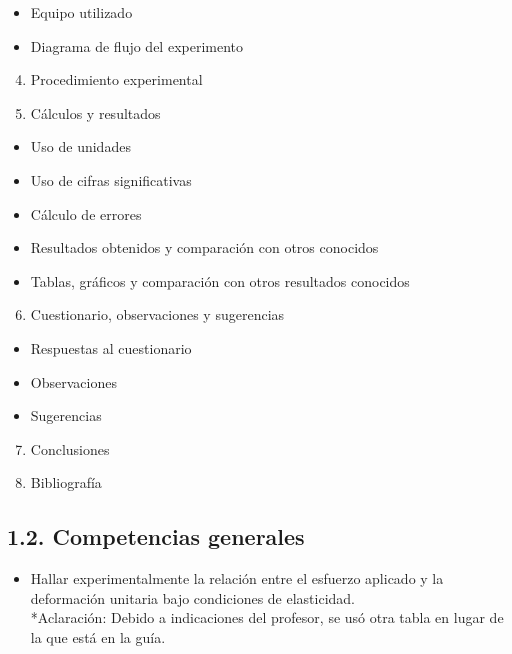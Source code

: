 \documentclass[10pt]{article}
\begin{document}
\begin{itemize}
  \item Equipo utilizado
  \item Diagrama de flujo del experimento
\end{itemize}

\begin{enumerate}
  \setcounter{enumi}{3}
  \item Procedimiento experimental
  \item Cálculos y resultados
\end{enumerate}

\begin{itemize}
  \item Uso de unidades
  \item Uso de cifras significativas
  \item Cálculo de errores
  \item Resultados obtenidos y comparación con otros conocidos
  \item Tablas, gráficos y comparación con otros resultados conocidos
\end{itemize}

\begin{enumerate}
  \setcounter{enumi}{5}
  \item Cuestionario, observaciones y sugerencias
\end{enumerate}

\begin{itemize}
  \item Respuestas al cuestionario
  \item Observaciones
  \item Sugerencias
\end{itemize}

\begin{enumerate}
  \setcounter{enumi}{6}
  \item Conclusiones
  \item Bibliografía
\end{enumerate}

\subsection*{1.2. Competencias generales}
\begin{itemize}
  \item Hallar experimentalmente la relación entre el esfuerzo aplicado y la deformación unitaria bajo condiciones de elasticidad.\\
*Aclaración: Debido a indicaciones del profesor, se usó otra tabla en lugar de la que está en la guía.
\end{itemize}
\end{document}
